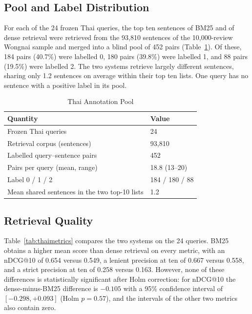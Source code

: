 \subsection{Pool and Label Distribution}
\label{sec:resthaipool}

For each of the 24 frozen Thai queries, the top ten sentences of BM25 and of dense retrieval were retrieved from the 93,810 sentences of the 10,000-review Wongnai sample and merged into a blind pool of 452 pairs (Table~\ref{tab:thaipool}). Of these, 184 pairs (40.7\%) were labelled 0, 180 pairs (39.8\%) were labelled 1, and 88 pairs (19.5\%) were labelled 2. The two systems retrieve largely different sentences, sharing only 1.2 sentences on average within their top ten lists. One query has no sentence with a positive label in its pool.

\begin{table}[htbp]
\centering
\caption{Thai Annotation Pool}
\label{tab:thaipool}
\small
\begin{tabular}{|p{}|p{}|}
\hline
\textbf{Quantity} & \textbf{Value} \\
\hline
Frozen Thai queries & 24 \\
\hline
Retrieval corpus (sentences) & 93,810 \\
\hline
Labelled query--sentence pairs & 452 \\
\hline
Pairs per query (mean, range) & 18.8 (13--20) \\
\hline
Label 0 / 1 / 2 & 184 / 180 / 88 \\
\hline
Mean shared sentences in the two top-10 lists & 1.2 \\
\hline
\end{tabular}
\end{table}

\subsection{Retrieval Quality}
\label{sec:resthaiquality}

Table~\ref{tab:thaimetrics} compares the two systems on the 24 queries. BM25 obtains a higher mean score than dense retrieval on every metric, with an nDCG@10 of 0.654 versus 0.549, a lenient precision at ten of 0.667 versus 0.558, and a strict precision at ten of 0.258 versus 0.163. However, none of these differences is statistically significant after Holm correction: for nDCG@10 the dense-minus-BM25 difference is $-0.105$ with a 95\% confidence interval of $[-0.298, +0.093]$ (Holm $p=0.57$), and the intervals of the other two metrics also contain zero.

